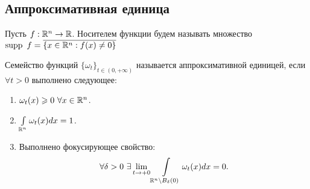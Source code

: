 \subsection{Аппроксимативная единица}
\begin{definition}
    Пусть $f: \mathbb{R}^n \rightarrow \mathbb{R}$. Носителем функции будем называть множество $\operatorname{supp} \ f = \overline{\{x \in \mathbb{R}^n : f(x) \neq 0 \}}$
\end{definition}

\begin{definition}
    Семейство функций $\{\omega_t\}_{t \in (0, +\infty)}$ называется аппроксимативной единицей, если $\forall t > 0$ выполнено следующее:
    \begin{enumerate}
        \item $\omega_t(x) \geqslant 0 \ \forall x \in \mathbb{R}^n$.
        \item $\int\limits_{\mathbb{R}^n} \omega_t(x) dx = 1$.
        \item Выполнено фокусирующее свойство: \[\forall \delta > 0  \ \exists \lim\limits_{t \rightarrow +0} \int\limits_{\mathbb{R}^n \setminus B_\delta(0)} \omega_{t}(x)dx = 0.\]
    \end{enumerate}
\end{definition}

